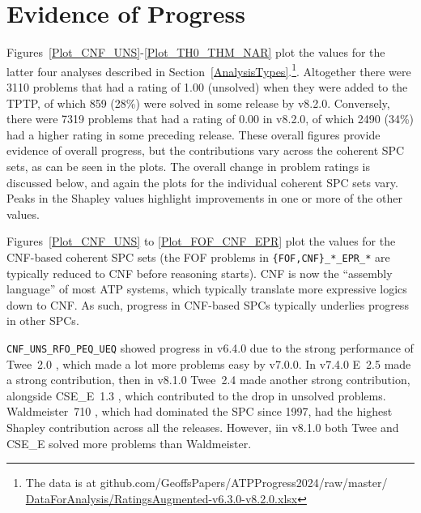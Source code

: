\documentclass[runningheads]{llncs}
\begin{document}
\section{Evidence of Progress}
\label{Evidence}

Figures~\ref{Plot_CNF_UNS}-\ref{Plot_TH0_THM_NAR} plot the values for the latter four analyses
described in Section~\ref{AnalysisTypes}.\footnote{%
The data is at github.com/GeoffsPapers/ATPProgress2024/raw/master/ 
\href{https://github.com/GeoffsPapers/ATPProgress2024/raw/master/DataForAnalysis/RatingsAugmented-v6.3.0-v8.2.0.xlsx}{DataForAnalysis/RatingsAugmented-v6.3.0-v8.2.0.xlsx}}.
Altogether there were 3110 problems that had a rating of 1.00 (unsolved) when they were added to
the TPTP, of which 859 (28\%) were solved in some release by v8.2.0. 
Conversely, there were 7319 problems that had a rating of 0.00 in v8.2.0, of which 2490 (34\%) 
had a higher rating in some preceding release.
These overall figures provide evidence of overall progress, but the contributions vary across
the coherent SPC sets, as can be seen in the plots.
The overall change in problem ratings is discussed below, and again the plots for the individual
coherent SPC sets vary.
Peaks in the Shapley values highlight improvements in one or more of the other values.

Figures~\ref{Plot_CNF_UNS} to \ref{Plot_FOF_CNF_EPR} plot the values for the CNF-based coherent 
SPC sets (the FOF problems in {\tt \{FOF,CNF\}\_*\_EPR\_*} are typically reduced to CNF before
reasoning starts).
CNF is now the ``assembly language'' of most ATP systems, which typically translate more
expressive logics down to CNF.
As such, progress in CNF-based SPCs typically underlies progress in other SPCs.

{\tt CNF\_UNS\_RFO\_PEQ\_UEQ} showed progress in v6.4.0 due to the strong performance of
Twee~2.0 \cite{Sma21}, which made a lot more problems easy by v7.0.0.
In v7.4.0 E~2.5 made a strong contribution, then in v8.1.0 Twee~2.4 made another strong 
contribution, alongside CSE\_E~1.3 \cite{XL+18}, which contributed to the drop in unsolved
problems.
Waldmeister~710 \cite{LH02}, which had dominated the SPC since 1997, had the highest Shapley 
contribution across all the releases.
However, iin v8.1.0 both Twee and CSE\_E solved more problems than Waldmeister.
 
\end{document}
